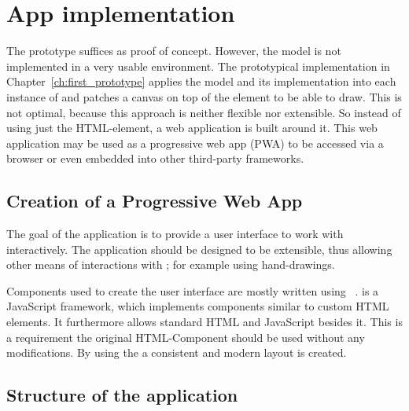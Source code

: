 \section{App implementation}\label{ch:app_implementation}

The prototype suffices as proof of concept.
However, the model is not implemented in a very usable environment.
The prototypical implementation in Chapter~\ref{ch:first_prototype} applies the model and its implementation into each instance of  and patches a canvas on top of the element to be able to draw.
This is not optimal, because this approach is neither flexible nor extensible.
So instead of using just the  HTML-element, a web application is built around it.
This web application may be used as a progressive web app (PWA) to be accessed via a browser or even embedded into other third-party frameworks.

\subsection{Creation of a Progressive Web App}

The goal of the application is to provide a user interface to work with  interactively.
The application should be designed to be extensible, thus allowing other means of interactions with ; for example using hand-drawings.

Components used to create the user interface are mostly written using ~\cite{Facebook2021}.
 is a JavaScript framework, which implements components similar to custom HTML elements.
It furthermore allows standard HTML and JavaScript besides it.
This is a requirement the original  HTML-Component should be used without any modifications.
By using the \cite{MaterialUI2020} a consistent and modern layout is created.

\subsection{Structure of the application}

